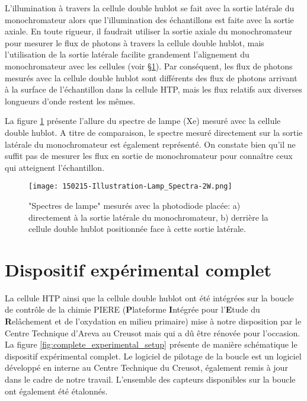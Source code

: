 \begin{refsection}
    L'illumination à travers la cellule double hublot se fait avec la sortie
    latérale du monochromateur alors que l'illumination des échantillons est faite avec la sortie axiale.
    En toute rigueur, il faudrait utiliser la sortie axiale du monochromateur
    pour mesurer le flux de photons à travers la cellule double hublot, mais l'utilisation de la sortie
    latérale facilite grandement l'alignement du monochromateur avec les cellules (voir \S\ref{sec:complete_experimental_setup}).    
    Par conséquent, les flux de photons mesurés avec la cellule double hublot sont différents des flux de photons
    arrivant à la surface de l'échantillon dans la cellule HTP, mais les flux relatifs aux diverses longueurs d'onde
    restent les mêmes.
    
    La figure \ref{fig:ch3_lamp_spectra_illustration} présente l'allure du spectre de lampe (Xe) mesuré avec la cellule
    double hublot. A titre de comparaison, le spectre mesuré directement sur la sortie latérale du monochromateur est
    également représenté. On constate bien qu'il ne suffit pas de mesurer les flux en sortie de monochromateur pour
    connaître ceux qui atteignent l'échantillon.

     
    \begin{figure}[H]
		\centering
		\texttt{[image: 150215-Illustration-Lamp\_Spectra-2W.png]}
        \caption
        {"Spectres de lampe" mesurés avec la photodiode placée: 
        a) directement à la sortie latérale du monochromateur,
        b) derrière la cellule double hublot positionnée face à cette sortie latérale.}
		\label{fig:ch3_lamp_spectra_illustration}
	\end{figure}



\section{Dispositif expérimental complet}\label{sec:complete_experimental_setup}

    La cellule HTP ainsi que la cellule double hublot ont été intégrées sur la boucle de contrôle de la chimie
    PIERE (\textbf{P}lateforme \textbf{I}ntégrée pour l'\textbf{E}tude du \textbf{R}elâchement et de 
    l'oxydation en milieu primaire) mise à notre
    disposition par le Centre Technique d'Areva au Creusot mais qui a dû être rénovée pour l'occasion.
    La figure \ref{fig:complete_experimental_setup} présente de manière schématique le dispositif expérimental complet.
    Le logiciel de pilotage de la boucle est un logiciel
    développé en interne au Centre Technique du Creusot, également remis à jour dans le cadre de notre travail.
    L'ensemble des capteurs disponibles sur la boucle ont également été étalonnés.


\end{refsection}
